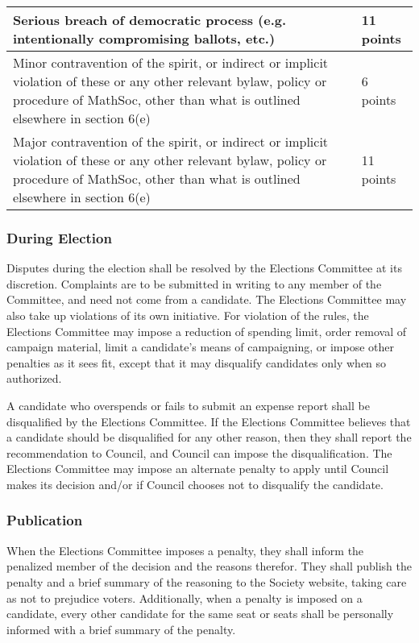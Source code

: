 \begin{center}
\begin{tabular}{| p{12cm} | p{3.5cm} |}
		\hline 
		Serious breach of democratic process (e.g. intentionally compromising ballots, etc.) & 11 points \\ 
		\hline
		Minor contravention of the spirit, or indirect or implicit violation of these or any other relevant bylaw, policy or procedure of MathSoc, other than what is outlined elsewhere in section 6(e) & 6 points \\
		\hline
		Major contravention of the spirit, or indirect or implicit violation of these or any other relevant bylaw, policy or procedure of MathSoc, other than what is outlined elsewhere in section 6(e) & 11 points \\
		\hline
	\end{tabular}
\end{center}

\subsubsection{During Election}
Disputes during the election shall be resolved by the Elections Committee at its discretion.
Complaints are to be submitted in writing to any member of the Committee, and need not come from a candidate.
The Elections Committee may also take up violations of its own initiative.
For violation of the rules, the Elections Committee may impose a reduction of spending limit, order removal of campaign material, limit a candidate's means of campaigning, or impose other penalties as it sees fit, except that it may disqualify candidates only when so authorized.

A candidate who overspends or fails to submit an expense report shall be disqualified by the Elections Committee.
If the Elections Committee believes that a candidate should be disqualified for any other reason, then they shall report the recommendation to Council, and Council can impose the disqualification.
The Elections Committee may impose an alternate penalty to apply until Council makes its decision and/or if Council chooses not to disqualify the candidate.

\subsubsection{Publication}
When the Elections Committee imposes a penalty, they shall inform the penalized member of the decision and the reasons therefor.
They shall publish the penalty and a brief summary of the reasoning to the Society website, taking care as not to prejudice voters.
Additionally, when a penalty is imposed on a candidate, every other candidate for the same seat or seats shall be personally informed with a brief summary of the penalty.

